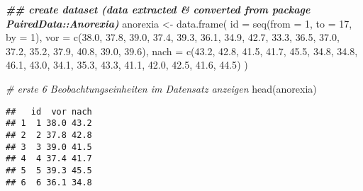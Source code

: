 \documentclass[
]{book}
\newenvironment{Shaded}{\begin{snugshade}}{\end{snugshade}}
\newcommand{\AttributeTok}[1]{\textcolor[rgb]{0.77,0.63,0.00}{#1}}
\newcommand{\CommentTok}[1]{\textcolor[rgb]{0.56,0.35,0.01}{\textit{#1}}}
\newcommand{\DecValTok}[1]{\textcolor[rgb]{0.00,0.00,0.81}{#1}}
\newcommand{\DocumentationTok}[1]{\textcolor[rgb]{0.56,0.35,0.01}{\textbf{\textit{#1}}}}
\newcommand{\FloatTok}[1]{\textcolor[rgb]{0.00,0.00,0.81}{#1}}
\newcommand{\FunctionTok}[1]{\textcolor[rgb]{0.00,0.00,0.00}{#1}}
\newcommand{\NormalTok}[1]{#1}
\newcommand{\OtherTok}[1]{\textcolor[rgb]{0.56,0.35,0.01}{#1}}
\newcommand{\SpecialCharTok}[1]{\textcolor[rgb]{0.00,0.00,0.00}{#1}}
\begin{document}
\begin{Shaded}
\begin{Highlighting}[]
\DocumentationTok{\#\# create dataset (data extracted \& converted from package PairedData::Anorexia)}
\NormalTok{anorexia }\OtherTok{\textless{}{-}} \FunctionTok{data.frame}\NormalTok{(}
  \AttributeTok{id =} \FunctionTok{seq}\NormalTok{(}\AttributeTok{from =} \DecValTok{1}\NormalTok{, }\AttributeTok{to =} \DecValTok{17}\NormalTok{, }\AttributeTok{by =} \DecValTok{1}\NormalTok{),}
  \AttributeTok{vor =} \FunctionTok{c}\NormalTok{(}\FloatTok{38.0}\NormalTok{, }\FloatTok{37.8}\NormalTok{, }\FloatTok{39.0}\NormalTok{, }\FloatTok{37.4}\NormalTok{, }\FloatTok{39.3}\NormalTok{, }\FloatTok{36.1}\NormalTok{, }\FloatTok{34.9}\NormalTok{, }\FloatTok{42.7}\NormalTok{, }\FloatTok{33.3}\NormalTok{, }\FloatTok{36.5}\NormalTok{, }\FloatTok{37.0}\NormalTok{, }\FloatTok{37.2}\NormalTok{, }\FloatTok{35.2}\NormalTok{, }\FloatTok{37.9}\NormalTok{, }\FloatTok{40.8}\NormalTok{, }\FloatTok{39.0}\NormalTok{, }\FloatTok{39.6}\NormalTok{),}
  \AttributeTok{nach =} \FunctionTok{c}\NormalTok{(}\FloatTok{43.2}\NormalTok{, }\FloatTok{42.8}\NormalTok{, }\FloatTok{41.5}\NormalTok{, }\FloatTok{41.7}\NormalTok{, }\FloatTok{45.5}\NormalTok{, }\FloatTok{34.8}\NormalTok{, }\FloatTok{34.8}\NormalTok{, }\FloatTok{46.1}\NormalTok{, }\FloatTok{43.0}\NormalTok{, }\FloatTok{34.1}\NormalTok{, }\FloatTok{35.3}\NormalTok{, }\FloatTok{43.3}\NormalTok{, }\FloatTok{41.1}\NormalTok{, }\FloatTok{42.0}\NormalTok{, }\FloatTok{42.5}\NormalTok{, }\FloatTok{41.6}\NormalTok{, }\FloatTok{44.5}\NormalTok{)}
\NormalTok{)}

\CommentTok{\# erste 6 Beobachtungseinheiten im Datensatz anzeigen}
\FunctionTok{head}\NormalTok{(anorexia)}
\end{Highlighting}
\end{Shaded}

\begin{verbatim}
##   id  vor nach
## 1  1 38.0 43.2
## 2  2 37.8 42.8
## 3  3 39.0 41.5
## 4  4 37.4 41.7
## 5  5 39.3 45.5
## 6  6 36.1 34.8
\end{verbatim}

\begin{Shaded}
\end{Shaded}
\end{document}
